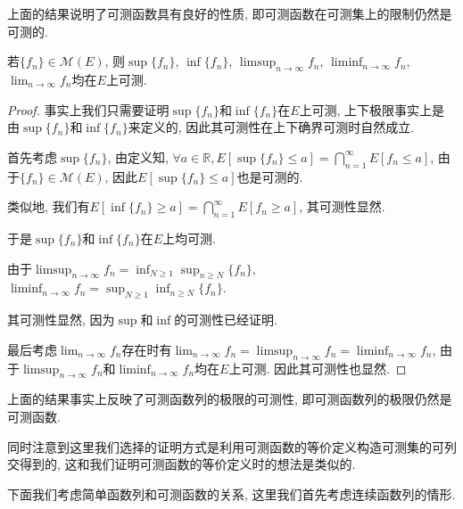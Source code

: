 \documentclass[theorem=false,mathfont=none,openany,sub3section]{easybook}
\begin{document}
\begin{remark}
  上面的结果说明了可测函数具有良好的性质, 即可测函数在可测集上的限制仍然是可测的.\par
\end{remark}

\begin{theorem}
  若$\{f_n\}\in \mathcal{M}(E)$, 则$\sup \{f_n\}$, $\inf \{f_n\}$, $\limsup_{n \to \infty} f_n$, $\liminf_{n \to \infty} f_n$, $\lim_{n \to \infty} f_n$均在$E$上可测.\par
\end{theorem}

\begin{proof}
  事实上我们只需要证明$\sup \{f_n\}$和$\inf \{f_n\}$在$E$上可测, 上下极限事实上是由$\sup \{f_n\}$和$\inf \{f_n\}$来定义的, 因此其可测性在上下确界可测时自然成立.\par
  首先考虑$\sup \{f_n\}$, 由定义知, $\forall a \in \mathbb{R}, E[\sup \{f_n\}\leqslant a]=\bigcap_{n=1}^{\infty}E[f_n\leqslant a]$, 由于$\{f_n\}\in \mathcal{M}(E)$, 因此$E[\sup \{f_n\}\leqslant a]$也是可测的.\par
  类似地, 我们有$E[\inf \{f_n\}\geqslant a]=\bigcap_{n=1}^{\infty}E[f_n\geqslant a]$, 其可测性显然.\par
  于是$\sup \{f_n\}$和$\inf \{f_n\}$在$E$上均可测.\par
  由于$\limsup_{n \to \infty} f_n = \inf_{N\geqslant 1} \sup_{n\geqslant N} \{f_n\}$, $\liminf_{n \to \infty} f_n = \sup_{N\geqslant 1} \inf_{n\geqslant N} \{f_n\}$.\par
  其可测性显然, 因为$\sup$和$\inf$的可测性已经证明.\par
  最后考虑$\lim_{n \to \infty} f_n$存在时有$\lim_{n \to \infty} f_n = \limsup_{n \to \infty} f_n = \liminf_{n \to \infty} f_n$, 由于$\limsup_{n \to \infty} f_n$和$\liminf_{n \to \infty} f_n$均在$E$上可测. 因此其可测性也显然.\par
\end{proof}

\begin{remark}
  上面的结果事实上反映了可测函数列的极限的可测性, 即可测函数列的极限仍然是可测函数.\par
  同时注意到这里我们选择的证明方式是利用可测函数的等价定义构造可测集的可列交得到的, 这和我们证明可测函数的等价定义时的想法是类似的.\par
\end{remark}

下面我们考虑简单函数列和可测函数的关系, 这里我们首先考虑连续函数列的情形.\par
\end{document}
